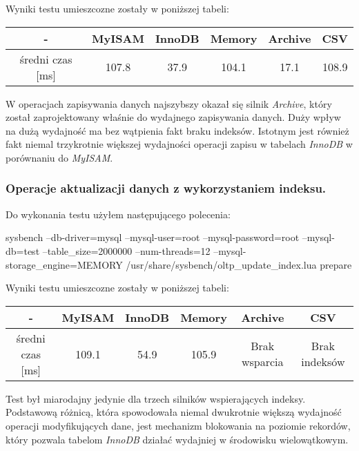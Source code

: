 Wyniki testu umieszcozne zostały w poniższej tabeli:
\begin{center}
	\begin{tabular}{ | c | c | c | c | c | c |}
		\hline
		- & MyISAM & InnoDB & Memory & Archive & CSV  \\ 
		\hline
		średni czas [ms] & 107.8 & 37.9 & 104.1 & 17.1 & 108.9 \\
		\hline
	\end{tabular}
\end{center}

W operacjach zapisywania danych najszybszy okazał się silnik \textit{Archive}, który został zaprojektowany właśnie do wydajnego zapisywania danych. Duży wpływ na dużą wydajność ma bez wątpienia fakt braku indeksów. Istotnym jest również fakt niemal trzykrotnie większej wydajności operacji zapisu w tabelach \textit{InnoDB} w porównaniu do \textit{MyISAM}.

\subsubsection{Operacje aktualizacji danych z wykorzystaniem indeksu.}

Do wykonania testu użyłem następującego polecenia:
\begin{spverbatim}
	sysbench --db-driver=mysql --mysql-user=root --mysql-password=root --mysql-db=test --table_size=2000000 --num-threads=12 --mysql-storage_engine=MEMORY /usr/share/sysbench/oltp_update_index.lua prepare
\end{spverbatim}

Wyniki testu umieszcozne zostały w poniższej tabeli:
\begin{center}
	\begin{tabular}{ | c | c | c | c | c | c |}
		\hline
		- & MyISAM & InnoDB & Memory & Archive & CSV  \\ 
		\hline
		średni czas [ms] & 109.1 & 54.9 & 105.9 & Brak wsparcia & Brak indeksów \\
		\hline
	\end{tabular}
\end{center}

Test był miarodajny jedynie dla trzech silników wspierających indeksy. Podstawową różnicą, która spowodowała niemal dwukrotnie większą wydajność operacji modyfikujących dane, jest mechanizm blokowania na poziomie rekordów, który pozwala tabelom \textit{InnoDB} działać wydajniej w środowisku wielowątkowym.

